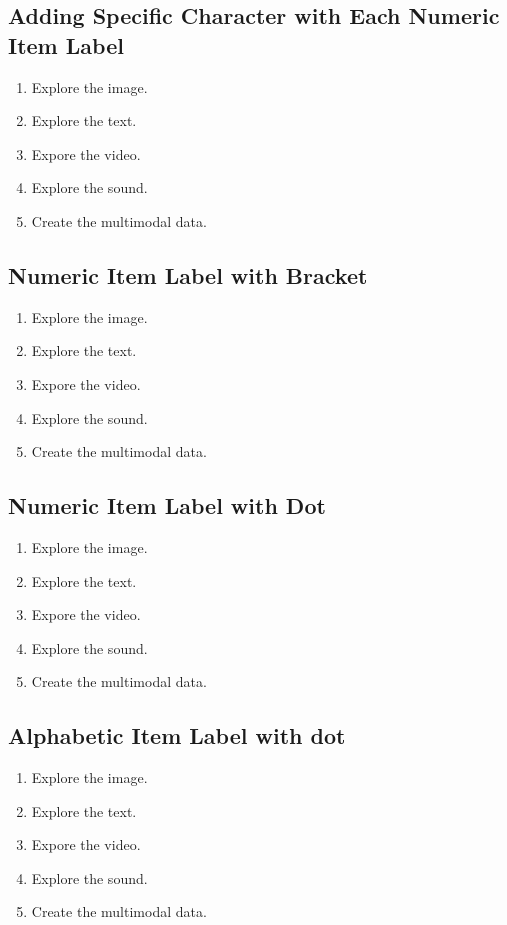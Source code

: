 \documentclass[11pt]{article}
\begin{document}
\subsection{Adding Specific Character with Each Numeric Item Label}
\begin{enumerate}[nosep, label=B\arabic*]
\item Explore the image.
\item Explore the text.
\item Expore the video.
\item Explore the sound.
\item Create the multimodal data.
\end{enumerate}


\subsection{Numeric Item Label with Bracket}
\begin{enumerate}[nosep, label=(\arabic*)]
\item Explore the image.
\item Explore the text.
\item Expore the video.
\item Explore the sound.
\item Create the multimodal data.
\end{enumerate}


\subsection{Numeric Item Label with Dot}
\begin{enumerate}[nosep, label=\arabic*.]
\item Explore the image.
\item Explore the text.
\item Expore the video.
\item Explore the sound.
\item Create the multimodal data.
\end{enumerate}


\subsection{Alphabetic Item Label with dot}
\begin{enumerate}[nosep, label=\alph*.]
\item Explore the image.
\item Explore the text.
\item Expore the video.
\item Explore the sound.
\item Create the multimodal data.
\end{enumerate}
\end{document}
